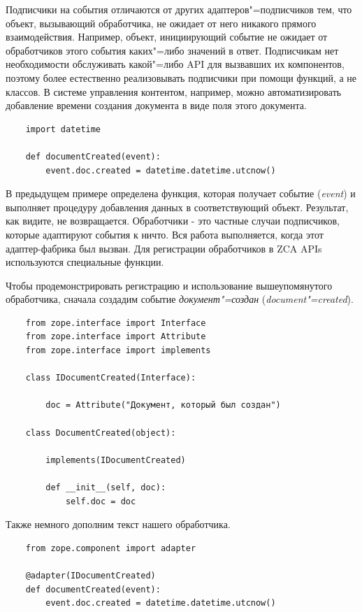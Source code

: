 \documentclass[a4paper,openany,twoside,draft]{book}
\providecommand*{\DUroletitlereference}[1]{\textsl{#1}}
\begin{document}
Подписчики на события отличаются от других адаптеров"=подписчиков тем, что объект, вызывающий обработчика, не ожидает от него никакого прямого взаимодействия.  Например, объект, инициирующий событие не ожидает от обработчиков этого события каких"=либо значений в ответ.  Подписчикам нет необходимости обслуживать какой"=либо API для вызвавших их компонентов, поэтому более естественно реализовывать подписчики при помощи функций, а не классов.  В системе управления контентом, например, можно автоматизировать добавление времени создания документа в виде поля этого документа.

\begin{verbatim}
    import datetime

    def documentCreated(event):
        event.doc.created = datetime.datetime.utcnow()
\end{verbatim}

В предыдущем примере определена функция, которая получает событие (\DUroletitlereference{event}) и выполняет процедуру добавления данных в соответствующий объект.  Результат, как видите, не возвращается.  Обработчики - это частные случаи подписчиков, которые адаптируют события к \textquotedbl{}ничто\textquotedbl{}.  Вся работа выполняется, когда этот адаптер-\textquotedbl{}фабрика\textquotedbl{} был вызван.  Для регистрации обработчиков в ZCA APIs используются специальные функции.

Чтобы продемонстрировать регистрацию и использование вышеупомянутого обработчика, сначала создадим событие \DUroletitlereference{документ"=создан} (\DUroletitlereference{document"=created}).

\begin{verbatim}
    from zope.interface import Interface
    from zope.interface import Attribute
    from zope.interface import implements

    class IDocumentCreated(Interface):

        doc = Attribute("Документ, который был создан")

    class DocumentCreated(object):

        implements(IDocumentCreated)

        def __init__(self, doc):
            self.doc = doc
\end{verbatim}

Также немного дополним текст нашего обработчика.

\begin{verbatim}
    from zope.component import adapter

    @adapter(IDocumentCreated)
    def documentCreated(event):
        event.doc.created = datetime.datetime.utcnow()
\end{verbatim}
\end{document}
